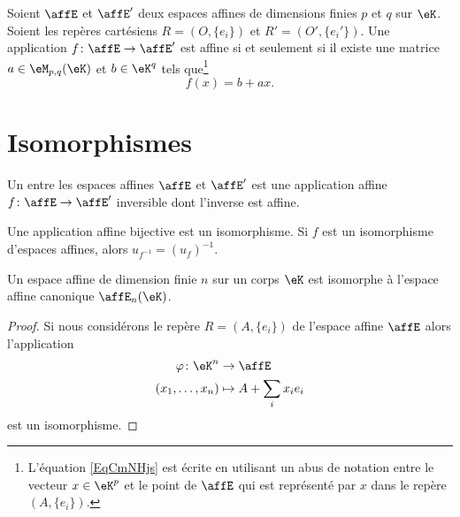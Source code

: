 \begin{theorem}     \label{THOooBAPDooEUtBgF}
	Soient \( \affE\) et \( \affE'\) deux espaces affines de dimensions finies \( p\) et \( q\) sur \( \eK\). Soient les repères cartésiens \( R=(O,\{ e_i \})\) et \( R'=(O',\{ e_i' \})\). Une application \( f\colon \affE\to \affE'\) est affine si et seulement si il existe une matrice \( a\in\eM_{p,q}(\eK)\) et \( b\in \eK^q\) tels que\footnote{L'équation \eqref{EqCmNHjs} est écrite en utilisant un abus de notation entre le vecteur \( x\in \eK^p\) et le point de \( \affE\) qui est représenté par \( x\) dans le repère \( (A,\{ e_i \})\).}
	\begin{equation}    \label{EqCmNHjs}
		f(x)=b+ax.
	\end{equation}
\end{theorem}

\section{Isomorphismes}

\begin{definition}
	Un  entre les espaces affines \( \affE\) et \( \affE'\) est une application affine \( f\colon \affE\to \affE'\) inversible dont l'inverse est affine.
\end{definition}

\begin{proposition} \label{PropxtFeDE}
	Une application affine bijective est un isomorphisme. Si \( f\) est un isomorphisme d'espaces affines, alors \( u_{f^{-1}}=(u_f)^{-1}\).
\end{proposition}

\begin{proposition}
	Un espace affine de dimension finie \( n\) sur un corps \( \eK\) est isomorphe à l'espace affine canonique \( \affE_n(\eK)\).
\end{proposition}

\begin{proof}
	Si nous considérons le repère \( R=(A,\{ e_i \})\) de l'espace affine \( \affE\) alors l'application
	\begin{equation}
		\begin{aligned}
			\varphi\colon \eK^n & \to \affE              \\
			(x_1,\ldots,x_n)    & \mapsto A+\sum_ix_ie_i
		\end{aligned}
	\end{equation}
	est un isomorphisme.
\end{proof}

